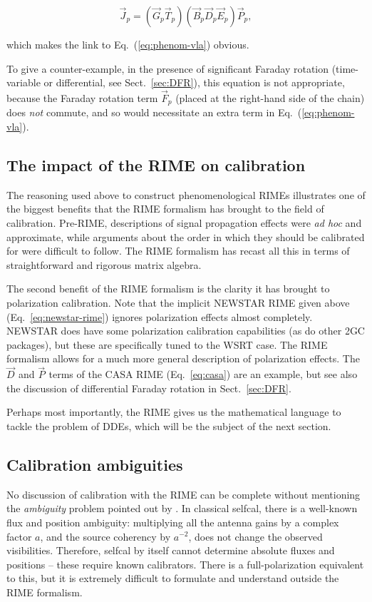 \documentclass{aa}
\newcommand{\jones}[2]{\vec {#1}_{#2}}
\begin{document}
\[
\jones{J}{p} = (\jones{G}{p}\jones{T}{p})(\jones{B}{p}\jones{D}{p}\jones{E}{p})\jones{P}{p},
\]

which makes the link to Eq.~(\ref{eq:phenom-vla}) obvious. 

To give a counter-example, in the presence of significant Faraday rotation (time-variable or differential, see Sect.~\ref{sec:DFR}), this equation is not appropriate, because the Faraday rotation term $\jones{F}{p}$ (placed at the right-hand side of the chain) does \emph{not} commute, and so would necessitate an extra term in Eq.~(\ref{eq:phenom-vla}). 

\subsection{The impact of the RIME on calibration}

The reasoning used above to construct phenomenological RIMEs illustrates one of the biggest benefits that the RIME formalism has brought to the field of calibration. Pre-RIME, descriptions of signal propagation effects were \emph{ad hoc} and approximate, while arguments about the order in which they should be calibrated for were difficult to follow. The RIME formalism has recast all this in terms of straightforward and rigorous matrix algebra.

The second benefit of the RIME formalism is the clarity it has brought to polarization calibration. Note that the implicit NEWSTAR RIME given above (Eq.~\ref{eq:newstar-rime}) ignores polarization effects almost completely. NEWSTAR does have some polarization calibration capabilities (as do other 2GC packages), but these are specifically tuned to the WSRT case. The RIME formalism allows for a much more general description of polarization effects. The $\jones{D}{}$ and $\jones{P}{}$ terms of the CASA RIME (Eq.~\ref{eq:casa}) are an example, but see also the discussion of differential Faraday rotation in Sect.~\ref{sec:DFR}. 

Perhaps most importantly, the RIME gives us the mathematical language to tackle the problem of DDEs, which will be the subject of the next section.

\subsection{Calibration ambiguities}

No discussion of calibration with the RIME can be complete without mentioning the {\em ambiguity} problem pointed out by \citet{ME4,ME5}. In classical selfcal, there is a well-known flux and position ambiguity: multiplying all the antenna gains by a complex factor $a$, and the source coherency by $a^{-2}$, does not change the observed visibilities. Therefore, selfcal by itself cannot determine absolute fluxes and positions -- these require known calibrators. There is a full-polarization equivalent to this, but it is extremely difficult to formulate and understand outside the RIME formalism.
\end{document}
